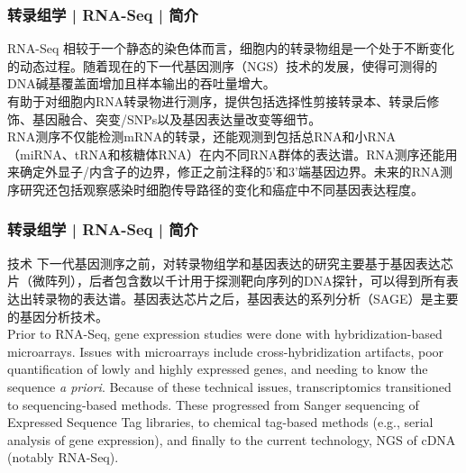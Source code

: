 \begin{frame}
  \frametitle{转录组学 | RNA-Seq | 简介}
  \begin{block}{RNA-Seq}
相较于一个静态的染色体而言，细胞内的转录物组是一个处于不断变化的动态过程。随着现在的下一代基因测序（NGS）技术的发展，使得可测得的DNA碱基覆盖面增加且样本输出的吞吐量增大。\\
\vspace{0.5em}
有助于对细胞内RNA转录物进行测序，提供包括选择性剪接转录本、转录后修饰、基因融合、突变/SNPs以及基因表达量改变等细节。\\
\vspace{0.5em}
RNA测序不仅能检测mRNA的转录，还能观测到包括总RNA和小RNA（miRNA、tRNA和核糖体RNA）在内不同RNA群体的表达谱。RNA测序还能用来确定外显子/内含子的边界，修正之前注释的5'和3'端基因边界。未来的RNA测序研究还包括观察感染时细胞传导路径的变化和癌症中不同基因表达程度。
  \end{block}
\end{frame}

\begin{frame}
  \frametitle{转录组学 | RNA-Seq | 简介}
  \begin{block}{技术}
下一代基因测序之前，对转录物组学和基因表达的研究主要基于基因表达芯片（微阵列），后者包含数以千计用于探测靶向序列的DNA探针，可以得到所有表达出转录物的表达谱。基因表达芯片之后，基因表达的系列分析（SAGE）是主要的基因分析技术。\\
\vspace{1em}
Prior to RNA-Seq, gene expression studies were done with hybridization-based microarrays. Issues with microarrays include cross-hybridization artifacts, poor quantification of lowly and highly expressed genes, and needing to know the sequence \textit{a priori}. Because of these technical issues, transcriptomics transitioned to sequencing-based methods. These progressed from Sanger sequencing of Expressed Sequence Tag libraries, to chemical tag-based methods (e.g., serial analysis of gene expression), and finally to the current technology, NGS of cDNA (notably RNA-Seq).
  \end{block}
\end{frame}

